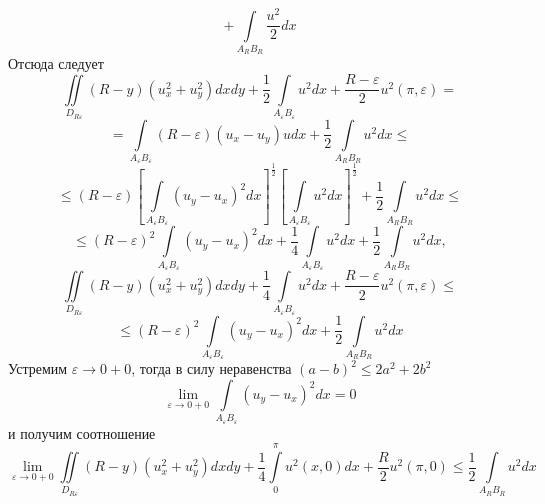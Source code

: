 \documentclass[a4paper, 9pt]{article}
\begin{document}
		\begin{equation*}
			+ \int\limits_{A_R B_R} \dfrac{u^2}{2}dx
		\end{equation*}
		Отсюда следует
		\begin{equation*}
			\iint\limits_{D_{R\varepsilon}} \left(R - y\right) \left(u_x^2 + u_y^2\right) dx dy + \dfrac{1}{2}\int\limits_{A_\varepsilon B_\varepsilon} u^2 dx +\dfrac{R - \varepsilon}{2}u^2(\pi, \varepsilon)  =
		\end{equation*}
		\begin{equation*}
			= \int\limits_{A_\varepsilon B_\varepsilon} \left(R - \varepsilon \right) \left(u_x - u_y\right)u dx + \dfrac12  \int\limits_{A_R B_R} u^2 dx \leq
		\end{equation*}
		\begin{equation*}
			\leq \left(R - \varepsilon\right) \left[\int\limits_{A_\varepsilon B_\varepsilon} \left( u_y - u_x\right)^2 dx \right]^{\frac12} \left[\int\limits_{A_\varepsilon B_\varepsilon} u^2 dx \right]^{\frac12} + \dfrac12 \int\limits_{A_RB_R} u^2 dx \leq
		\end{equation*}
		\begin{equation*}
			\leq \left(R - \varepsilon\right)^2 \int\limits_{A_\varepsilon B_\varepsilon} \left( u_y - u_x\right)^2 dx + \dfrac14 \int\limits_{A_\varepsilon B_\varepsilon} u^2 dx +\dfrac12 \int\limits_{A_RB_R} u^2 dx, 
		\end{equation*}
		\begin{equation*}
			\iint\limits_{D_{R\varepsilon}} \left(R - y\right) \left(u_x^2 + u_y^2\right) dx dy + \dfrac{1}{4}\int\limits_{A_\varepsilon B_\varepsilon} u^2 dx +\dfrac{R - \varepsilon}{2}u^2(\pi, \varepsilon) \leq 
		\end{equation*}
		\begin{equation*}
			\leq \left(R - \varepsilon\right)^2 \int\limits_{A_\varepsilon B_\varepsilon} \left( u_y - u_x\right)^2 dx  +\dfrac12 \int\limits_{A_RB_R} u^2 dx
		\end{equation*}
		Устремим $\varepsilon \to 0 + 0$, тогда в силу неравенства $(a-b)^2 \leq 2a^2 + 2b^2$
		\begin{equation*}
			\lim\limits_{\varepsilon \to 0 + 0} \int\limits_{A_\varepsilon B_\varepsilon} \left(u_y - u_x\right)^2 dx = 0
		\end{equation*}
		и получим соотношение
		\begin{equation*}
			\lim\limits_{\varepsilon \to 0 + 0} \iint\limits_{D_{R\varepsilon}} \left(R - y\right) \left(u_x^2 + u_y^2 \right) dx dy + \dfrac14 \int\limits_0^\pi u^2(x,0) dx + \dfrac{R}{2}u^2(\pi,0) \leq \dfrac12 \int\limits_{A_RB_R} u^2 dx
		\end{equation*}
\end{document}
